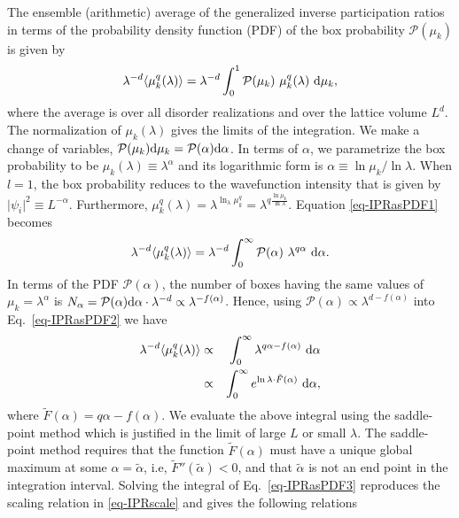 The ensemble (arithmetic) average of the generalized inverse participation ratios in terms of the probability density function (PDF) of the box probability $\mathcal{P}(\mu_k)$ is given by
%
\begin{equation}
\label{eq-IPRasPDF1}
 \lambda^{-d}\langle\mu_k^q(\lambda)\rangle=\lambda^{-d}\int_0^1 \mathcal{P}(\mu_k)~\mu_k^q(\lambda)~\mathrm{d} \mu_k,
\end{equation}
%
where the average is over all disorder realizations and over the lattice volume $L^d$.  The normalization of $\mu_k(\lambda)$ gives the limits of the integration. 
We make a change of variables, $\mathcal{P}(\mu_k)\mathrm{d}\mu_k=\mathcal{P}(\alpha)\mathrm{d}\alpha$.  In terms of $\alpha$, we parametrize the box probability to be $\mu_k(\lambda)\equiv \lambda^\alpha$ and its logarithmic form is $\alpha\equiv\ln\mu_k/\ln\lambda$.  When $l=1$, the box probability reduces to the wavefunction intensity that is given by $\vert\psi_i\vert^2\equiv L^{-\alpha}$.
Furthermore, $\mu_k^q(\lambda)=\lambda^{\ln_\lambda \mu_k^q}=\lambda^{q\frac{\ln\mu_k}{\ln\lambda}}$.  Equation \eqref{eq-IPRasPDF1} becomes
%
\begin{equation}
\label{eq-IPRasPDF2}
 \lambda^{-d}\langle\mu_k^q(\lambda)\rangle=\lambda^{-d}\int_0^\infty \mathcal{P}(\alpha)~\lambda^{q\alpha}~\mathrm{d}\alpha.
\end{equation}
%
In terms of the PDF $\mathcal{P}(\alpha)$, the number of boxes having the same values of $\mu_k=\lambda^\alpha$ is $N_\alpha=\mathcal{P}(\alpha)\mathrm{d}\alpha\cdot \lambda^{-d}\propto \lambda^{-f(\alpha)}$.  Hence, using $\mathcal{P}(\alpha)\propto \lambda^{d-f(\alpha)}$ into Eq.~\eqref{eq-IPRasPDF2} we have
%
\begin{eqnarray}
\label{eq-IPRasPDF3}
 \lambda^{-d}\langle\mu_k^q(\lambda)\rangle & \propto & \int_0^\infty \lambda^{q\alpha-f(\alpha)}~\mathrm{d}\alpha \nonumber\\
					    & \propto & \int_0^\infty e^{\ln\lambda\cdot \tilde{F}(\alpha)}~\mathrm{d}\alpha,
\end{eqnarray}
%
where $\tilde{F}(\alpha)=q\alpha-f(\alpha)$.  We evaluate the above integral using the saddle-point method which is justified in the limit of large $L$ or small $\lambda$.  The saddle-point method requires that the function $\tilde{F}(\alpha)$ must have a unique global maximum at some $\alpha=\tilde{\alpha}$, i.e, $\tilde{F}''(\tilde{\alpha})<0$, and that $\tilde{\alpha}$ is not an end point in the integration interval.  
Solving the integral of Eq.~\eqref{eq-IPRasPDF3} reproduces the scaling relation in \eqref{eq-IPRscale} and gives the following relations
